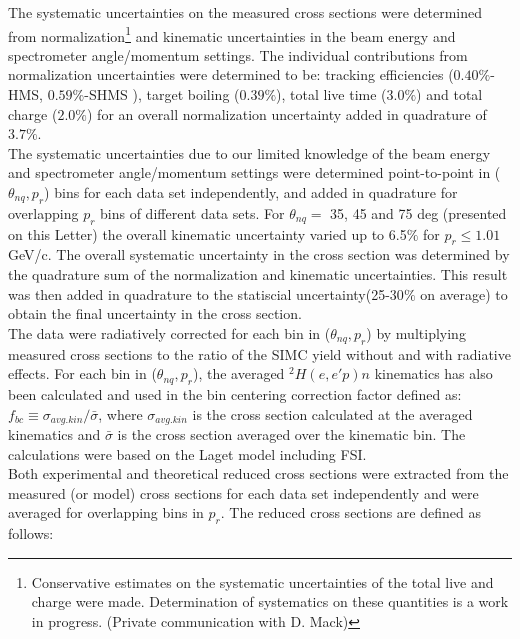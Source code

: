\indent The systematic uncertainties on the measured cross sections were determined from normalization\footnote{Conservative estimates on the systematic uncertainties of the total live and charge were made.
Determination of systematics on these quantities is a work in progress. (Private communication with D. Mack)} and kinematic uncertainties in the beam energy and spectrometer angle/momentum settings. The individual
contributions from normalization uncertainties were determined to be: tracking efficiencies ($0.40 \%$-HMS, $0.59 \%$-SHMS ), target boiling ($0.39 \%$), total live time ($3.0 \%$) and total charge ($2.0\%$)
for an overall normalization uncertainty added in quadrature of $3.7 \%$. \\
\indent The systematic uncertainties due to our limited knowledge of the beam energy and spectrometer angle/momentum settings were determined point-to-point in ($\theta_{nq}, p_{r}$) bins for each data set independently, and added in quadrature for overlapping $p_{r}$ bins
of different data sets. For $\theta_{nq}=$ 35, 45 and 75 deg (presented on this Letter) the overall kinematic uncertainty varied up to 6.5$\%$ for $p_{r}\leq1.01$ GeV/c.
The overall systematic uncertainty in the cross section was determined by the quadrature sum of the normalization and kinematic uncertainties. This result was then added in quadrature
to the statiscial uncertainty(25-30$\%$ on average) to obtain the final uncertainty in the cross section. \\
\indent The data were radiatively corrected for each bin in ($\theta_{nq}, p_{r}$) by multiplying measured cross sections to the ratio of the SIMC yield without and with radiative effects.
For each bin in ($\theta_{nq}, p_{r}$), the averaged $^{2}H(e,e'p)n$ kinematics has also been calculated and used in the bin centering correction factor defined as:
$f_{bc} \equiv \sigma_{avg.kin} / \bar{\sigma}$, where $\sigma_{avg.kin}$ is the cross section calculated at the averaged kinematics and $\bar{\sigma}$ is the cross
section averaged over the kinematic bin. The calculations were based on the Laget model including FSI\cite{LAGET2005, PhysRevC.21.861}.\\
\indent  Both experimental and theoretical reduced cross sections were extracted from the measured (or model) cross sections for each data set independently
and were averaged for overlapping bins in $p_{r}$. The reduced cross sections are defined as follows:
\onecolumngrid
